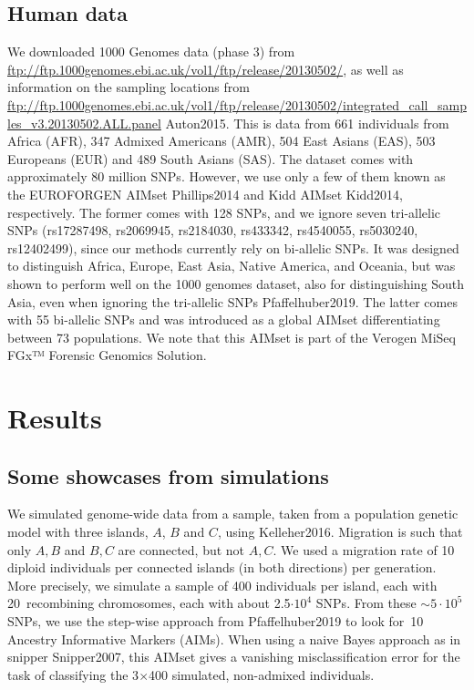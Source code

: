 \documentclass[12pt]{article}
\theoremstyle{definition}
\begin{document}
\subsection{Human data}
\sloppy We downloaded 1000 Genomes data (phase 3) from
\url{ftp://ftp.1000genomes.ebi.ac.uk/vol1/ftp/release/20130502/}, as
well as information on the sampling locations from
\url{ftp://ftp.1000genomes.ebi.ac.uk/vol1/ftp/release/20130502/integrated_call_samples_v3.20130502.ALL.panel}
\cite{article}{Auton2015}. This is data from 661 individuals from Africa (AFR),
347 Admixed Americans (AMR), 504 East Asians (EAS), 503 Europeans
(EUR) and 489 South Asians (SAS). The dataset comes with approximately
80 million SNPs. However, we use only a few of them known as the
EUROFORGEN AIMset \cite{article}{Phillips2014} and Kidd AIMset \cite{article}{Kidd2014},
respectively. The former comes with 128 SNPs, and we ignore seven
tri-allelic SNPs (rs17287498, rs2069945, rs2184030, rs433342,
rs4540055, rs5030240, rs12402499), since our methods currently rely on
bi-allelic SNPs. It was designed to distinguish Africa, Europe, East
Asia, Native America, and Oceania, but was shown to perform well on
the 1000 genomes dataset, also for distinguishing South Asia, even
when ignoring the tri-allelic SNPs \cite{article}{Pfaffelhuber2019}.  The
latter comes with 55 bi-allelic SNPs and was introduced as a global
AIMset differentiating between 73 populations. We note that this
AIMset is part of the Verogen MiSeq FGx™ Forensic Genomics Solution.

\section{Results}

\subsection{Some showcases from simulations}
We simulated genome-wide data from a sample, taken from a population
genetic model with three islands, $A$, $B$ and $C$, using
\cite{article}{Kelleher2016}. Migration is such that only $A, B$ and $B, C$ are
connected, but not $A, C$. We used a migration rate of 10 diploid
individuals per connected islands (in both directions) per
generation. More precisely, we simulate a sample of 400 individuals
per island, each with 20~recombining chromosomes, each with about
2.5$\cdot 10^4$ SNPs. From these $\sim 5\cdot 10^5$ SNPs, we use the
step-wise approach from \cite{article}{Pfaffelhuber2019} to look for~10
Ancestry Informative Markers (AIMs). When using a naive Bayes approach
as in {\sc snipper} \cite{article}{Snipper2007}, this AIMset gives a vanishing
misclassification error for the task of classifying the 3$\times$400
simulated, non-admixed individuals.
\end{document}
